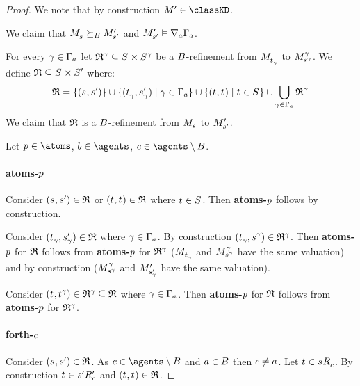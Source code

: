 \begin{proof}

We note that by construction $\kModelP \in \classKD$.

We claim that $\kPModel{\kStateS} \simulatesBs \kPModelP{\kStateSP}$ and $\kPModelP{\kStateSP} \entails \coversA \Gamma_\agentA$.

For every $\gamma \in \Gamma_\agentA$ let $\refinement^\gamma \subseteq \kStates \times \kStates[\gamma]$ be a $\agentsB$-refinement from $\kPModel{\kStateT_\gamma}$ to $\kPModel[\gamma]{\kStateS[\gamma]}$.
We define $\refinement \subseteq \kStates \times \kStatesP$ where:
$$
\refinement = \{(\kStateS, \kStateSP)\} \cup \{(\kStateT_\gamma, \kStateSP_\gamma) \mid \gamma \in \Gamma_\agentA\} \cup \{(\kStateT, \kStateT) \mid \kStateT \in \kStates\} \cup \bigcup_{\gamma \in \Gamma_\agentA} \refinement^\gamma
$$
We claim that $\refinement$ is a $\agentsB$-refinement from $\kPModel{\kStateS}$ to $\kPModelP{\kStateSP}$.

Let $\atomP \in \atoms$, $\agentB \in \agents$, $\agentC \in \agents \setminus \agentsB$.

\paragraph{atoms-$\atomP$}
Consider $(\kStateS, \kStateSP) \in \refinement$ or $(\kStateT, \kStateT) \in \refinement$ where $\kStateT \in \kStates$.
Then {\bf atoms-$\atomP$} follows by construction.

Consider $(\kStateT_\gamma, \kStateSP_\gamma) \in \refinement$ where $\gamma \in \Gamma_\agentA$.
By construction $(\kStateT_\gamma, \kStateS[\gamma]) \in \refinement^\gamma$.
Then {\bf atoms-$\atomP$} for $\refinement$ follows from {\bf atoms-$\atomP$} for $\refinement^\gamma$ ($\kPModel{\kStateT_\gamma}$ and $\kPModel[\gamma]{\kStateS[\gamma]}$ have the same valuation) and by construction ($\kPModel[\gamma]{\kStateS[\gamma]}$ and $\kPModelP{\kStateSP_\gamma}$ have the same valuation).

Consider $(\kStateT, \kStateT[\gamma]) \in \refinement^\gamma \subseteq \refinement$ where $\gamma \in \Gamma_\agentA$.
Then {\bf atoms-$\atomP$} for $\refinement$ follows from {\bf atoms-$\atomP$} for $\refinement^\gamma$.

\paragraph{forth-$\agentC$}
Consider $(\kStateS, \kStateSP) \in \refinement$.
As $\agentC \in \agents \setminus \agentsB$ and $\agentA \in \agentsB$ then $\agentC \neq \agentA$.
Let $\kStateT \in \kSuccessorsC{\kStateS}$.
By construction $\kStateT \in \kSuccessorsPC{\kStateSP}$ and $(\kStateT, \kStateT) \in \refinement$.


\end{proof}
